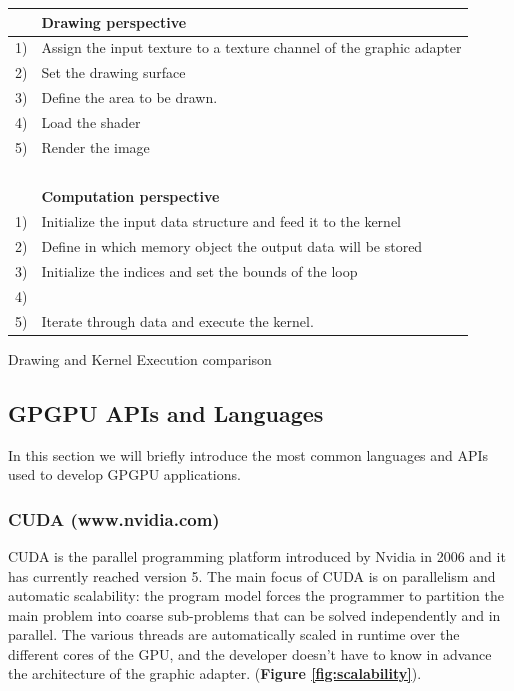 \begin{tablehere}
{\footnotesize
\begin{tabular}{|p{}|p{7cm}|}\hline
~ & \textbf{Drawing perspective}\\ \hline
1) & Assign the input texture to a texture channel of the graphic adapter\\ \hline
2) & Set the drawing surface \\ \hline
3) & Define the area to be drawn.\\ \hline
4) & Load the shader\\ \hline
5) & Render the image\\ \hline
~ & ~\\ \hline
~ & \textbf{Computation perspective}\\ \hline
1) & Initialize the input data structure and feed it to the kernel\\ \hline
2) & Define in which memory object the output data will be stored\\ \hline
3) & Initialize the indices and set the bounds of the loop \\ \hline
4) &  ~\\ \hline
5) & Iterate through data and execute the kernel.\\ \hline
\end{tabular}}
  \caption{Drawing and Kernel Execution comparison\\}
	\label{tab:computeVsDraw}
\end{tablehere}

\subsection{GPGPU APIs and Languages}

In this section we will briefly introduce the most common languages and APIs used to develop GPGPU applications.

\subsubsection{CUDA (www.nvidia.com)} \label{sect:CUDA}
CUDA is the parallel programming platform introduced by Nvidia in 2006 and it has currently reached version 5.
The main focus of CUDA is on parallelism and automatic scalability: the program model forces the programmer to partition the main problem into coarse sub-problems that can be solved independently and in parallel. The various threads are automatically scaled in runtime over the different cores of the GPU, and the developer doesn't have to know in advance the architecture of the graphic adapter. (\textbf{Figure \ref{fig:scalability}}).


